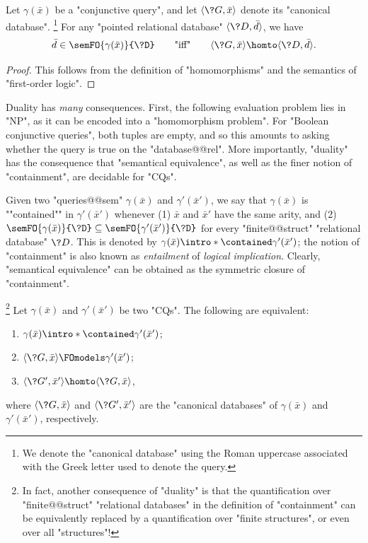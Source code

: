 \begin{proposition}[""Duality""]
	\AP\label{prop:duality}
	Let $\gamma(\bar x)$ be a "conjunctive query",
	and let $\tup{\?G, \bar x}$ denote its "canonical database".%
	\footnote{We denote the "canonical database" using the Roman
	uppercase associated with the Greek letter used to denote
	the query.}
	For any "pointed relational database" $\tup{\?D, \bar d}$,
	we have
	\[
		\bar d \in \semFO{\gamma(\bar x)}{\?D}
		\qquad\text{"iff"}\qquad
		\tup{\?G, \bar x} \homto \tup{\?D, \bar d}.
	\]
\end{proposition}

\begin{proof}
	This follows from the definition of "homomorphisms" and
	the semantics of "first-order logic".
\end{proof}

Duality has \emph{many} consequences. First, the following evaluation problem
lies in "NP", as it can be encoded into a "homomorphism problem".
For "Boolean conjunctive queries", both tuples are empty, and so
this amounts to asking whether the query is true on the "database@@rel".
More importantly, "duality" has the consequence that
"semantical equivalence", as well as the finer notion of "containment",
are decidable for "CQs".

Given two "queries@@sem" $\gamma(\bar x)$ and $\gamma'(\bar x')$,
we say that $\gamma(\bar x)$ is ""contained"" in $\gamma'(\bar x')$
whenever (1) $\bar x$ and $\bar x'$ have the same arity, and (2)
$\semFO{\gamma(\bar x)}{\?D} \subseteq \semFO{\gamma'(\bar x')}{\?D}$
for every "finite@@struct" "relational database" $\?D$. This is denoted by
$\gamma(\bar x) \intro*\contained \gamma'(\bar x')$; the notion
of "containment" is also known as \emph{entailment} of \emph{logical implication}.
Clearly, "semantical equivalence" can be obtained as the symmetric
closure of "containment".

\begin{proposition}
	\!\footnote{In fact, another consequence of "duality" is that
	the quantification over "finite@@struct" "relational databases"
	in the definition of "containment" can be equivalently replaced
	by a quantification over "finite structures", or even over all "structures"!}
	\AP\label{prop:containment-hom}
	Let $\gamma(\bar x)$ and $\gamma'(\bar x')$ be two "CQs".
	The following are equivalent:
	\begin{enumerate}
		\item $\gamma(\bar x) \intro*\contained \gamma'(\bar x')$;
		\item $\tup{\?G, \bar x} \FOmodels \gamma'(\bar x')$;
		\item $\tup{\?G', \bar x'} \homto \tup{\?G, \bar x}$,
	\end{enumerate}
	where $\tup{\?G, \bar x}$ and $\tup{\?G', \bar x'}$ are the "canonical databases"
	of $\gamma(\bar x)$ and $\gamma'(\bar x')$, respectively.
\end{proposition}

